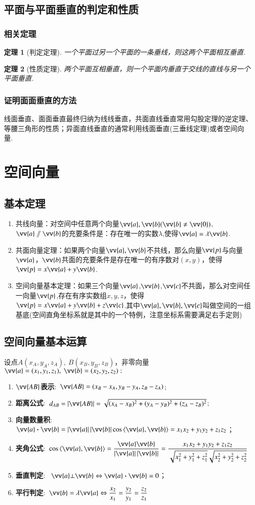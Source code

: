 \documentclass{BHCexam}
\newcommand{\tbf}[1]{\item \textbf{#1}:\ }
\newtheorem{Therome}{定理}[section]
\begin{document}
\subsection{平面与平面垂直的判定和性质}
\subsubsection{相关定理}
\begin{Therome}[判定定理]
一个平面过另一个平面的一条垂线，则这两个平面相互垂直.
\end{Therome}
\begin{Therome}[性质定理]
两个平面互相垂直，则一个平面内垂直于交线的直线与另一个平面垂直.
\end{Therome}
\subsubsection{证明面面垂直的方法}
线面垂直、面面垂直最终归纳为线线垂直，共面直线垂直常用勾股定理的逆定理、等腰三角形的性质；异面直线垂直的通常利用线面垂直(三垂线定理)或者空间向量.
\section{空间向量}
\subsection{基本定理}
\begin{enumerate}[1)]
\item 共线向量：对空间中任意两个向量$\vv{a},\vv{b}(\vv{b}\ne\vv{0})$,$\vv{a}\sslash\vv{b}$的充要条件是：存在唯一的实数$\lambda$,使得$\vv{a}=\lambda\vv{b}$.
\item 共面向量定理：如果两个向量$\vv{a},\vv{b}$不共线，那么向量$\vv{p}$与向量$\vv{a}$，$\vv{b}$共面的充要条件是存在唯一的有序数对$(x,y)$，使得$\vv{p}=x\vv{a}+y\vv{b}$.
\item 空间向量基本定理：如果三个向量$\vv{a}$,$\vv{b}$,$\vv{c}$不共面，那么对空间任一向量$\vv{p}$,存在有序实数组${x,y,z}$，使得$\vv{p}=x\vv{a}+y\vv{b}+z\vv{c}$.其中${\vv{a},\vv{b},\vv{c}}$叫做空间的一组基底(空间直角坐标系就是其中的一个特例，注意坐标系需要满足右手定则)
\end{enumerate}
\subsection{空间向量基本运算}
	{\kaishu 设点$ A(x_A,y_A,z_A),\ B(x_B,y_B,z_B) $，非零向量$ \vv{a}=(x_1,y_1,z_1),\ \vv{b}=(x_2,y_2,z_2) :$}\par
\begin{enumerate}[1)]
\tbf{$\vv{AB}$表示}$\vv{AB}=(x_B-x_A,y_B-y_A,z_B-z_A)$;
\tbf{距离公式}$ d_{AB}=\abs{\vv{AB}}=\sqrt{(x_A-x_B)^2+(y_A-y_B)^2+(z_A-z_B)^2} $;
\tbf{向量数量积}$\vv{a}\bm{\cdot}\vv{b}=\left|\vv{a}\right|\left|\vv{b}\right|\cos\left<\vv{a},\vv{b}\right>=x_1x_2+y_1y_2+z_1z_2$；
\tbf{夹角公式}$\cos \left<\vv{a},\vv{b}\right>=\dfrac{\vv{a}\vv{b}}{\left|\vv{a}\right|\left|\vv{b}\right|}=\dfrac{x_1x_2+y_1y_2+z_1z_2}{\sqrt{x_1^2+y_1^2+z_1^2}\sqrt{x_2^2+y_2^2+z_2^2}}$
\tbf{垂直判定} $\vv{a}\bot\vv{b}\Leftrightarrow\vv{a}\bm{\cdot}\vv{b}=0$；
\tbf{平行判定}$\vv{b}=\lambda \vv{a}\Leftrightarrow \dfrac{x_2}{x_1}=\dfrac{y_2}{y_1}=\dfrac{z_2}{z_1}$
\end{enumerate}
\end{document}
